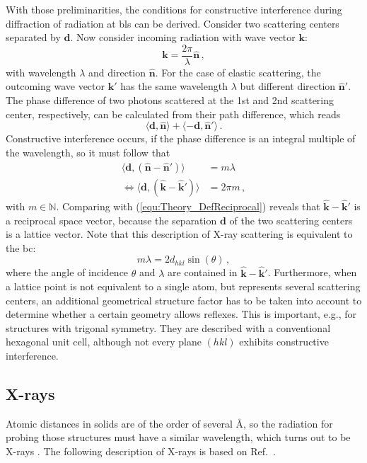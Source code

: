 With those preliminarities, the conditions for constructive interference during dif\-frac\-tion of radiation at \glspl{bl} can be derived.
Consider two scattering centers separated by $\mathbf{d}$.
Now consider incoming radiation with wave vector $\mathbf{k}$:
\begin{equation}
        \mathbf{k}=\frac{2\pi}{\lambda}\hat{\mathbf{n}}\,,
\end{equation}
with wavelength $\lambda$ and direction $\hat{\mathbf{n}}$.
For the case of elastic scattering, the outcoming wave vector $\mathbf{k}'$ has the same wavelength $\lambda$ but different direction $\hat{\mathbf{n}}'$.
The phase difference of two photons scattered at the 1st and 2nd scattering center, respectively, can be calculated from their path difference, which reads
\begin{equation}
    \langle\mathbf{d},\hat{\mathbf{n}}\rangle+\langle-\mathbf{d},\hat{\mathbf{n}}'\rangle\,.
\end{equation}
Constructive interference occurs, if the phase difference is an integral multiple of the wavelength, so it must follow that
\begin{align}
    \langle\mathbf{d},(\hat{\mathbf{n}}-\hat{\mathbf{n}}')\rangle&=m\lambda\\
    \Leftrightarrow\langle\mathbf{d},(\hat{\mathbf{k}}-\hat{\mathbf{k}}')\rangle&=2\pi m\,,
\end{align}
with $m\in\mathbb{N}$.
Comparing with (\ref{equ:Theory_DefReciprocal}) reveals that $\hat{\mathbf{k}}-\hat{\mathbf{k}}'$ is a reciprocal space vector, because the separation $\mathbf{d}$ of the two scattering centers is a lattice vector.
Note that this description of X-ray scattering is equivalent to the \gls{bc}:
\begin{equation}\label{Equ:Theory_BraggCondition}
    m\lambda=2d_{hkl}\sin(\theta)\,,
\end{equation}
where the angle of incidence $\theta$ and $\lambda$ are contained in $\hat{\mathbf{k}}-\hat{\mathbf{k}}'$.
Furthermore, when a lattice point is not equivalent to a single atom, but represents several scattering centers, an additional geometrical structure factor has to be taken into account to determine whether a certain geometry allows reflexes.
This is important, e.g., for structures with trigonal symmetry. 
They are described with a conventional hexagonal unit cell, although not every plane $(hkl)$ exhibits constructive interference.

\subsection{X-rays}
Atomic distances in solids are of the order of several \si{\angstrom}, so the radiation for probing those structures must have a similar wavelength, which turns out to be X-rays
    \cite{harrington2021}.
The following description of X-rays is based on Ref.~\cite{spiess2009}.

